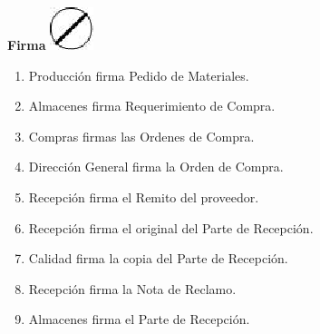 \begin{center}
  \textbf{Firma}
  \includegraphics{./Images/Simbolos/simbolo-Firma.png}
\end{center}
\begin{enumerate}
  \item Producción firma Pedido de Materiales.
  \item Almacenes firma Requerimiento de Compra.
  \item Compras firmas las Ordenes de Compra.
  \item Dirección General firma la Orden de Compra.
  \item Recepción firma el Remito del proveedor.
  \item Recepción firma el original del Parte de Recepción.
  \item Calidad firma la copia del Parte de Recepción.
  \item Recepción firma la Nota de Reclamo.
  \item Almacenes firma el Parte de Recepción.
\end{enumerate}

